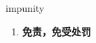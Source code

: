 
\begin{frame}
{\huge impunity}
\begin{center}
\begin{enumerate}\Large
  \item \textbf{免责，免受处罚}
\end{enumerate}
\end{center}
\end{frame}
